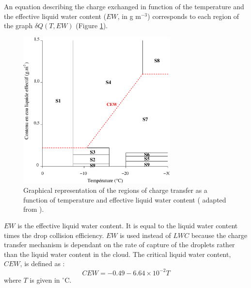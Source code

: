 An equation describing the charge exchanged in function of the temperature and the effective liquid water content ($EW$, in g m$^{-3}$) corresponds to each region of the graph $\delta Q(T,EW)$ (Figure \ref{fig:saunders}).
\begin{figure}[h]
  \begin{center}
    \includegraphics[width=8cm]{./EPS/saunders.eps}
  \end{center}
  \caption{\small Graphical representation of the regions of charge transfer as a function of temperature and effective liquid water content (\citet{Helsdon-2001} adapted from \citet{Saunders-1991}).}
  \label{fig:saunders}
\end{figure}
$EW$ is the effective liquid water content.
It is equal to the liquid water content times the drop collision efficiency. 
$EW$ is used instead of $LWC$ because the charge transfer mechanism is dependant on the rate of capture of the droplets rather than the liquid water content in the cloud.
The critical liquid water content, $CEW$, is defined as :
\begin{equation}
  CEW = -0.49 - 6.64 \times 10^{-2} T
\end{equation}
where $T$ is given in $^{\circ}$C.

